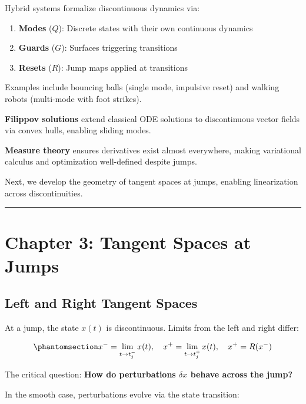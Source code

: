\documentclass[
  letterpaper,
  DIV=11,
  numbers=noendperiod]{scrartcl}
\providecommand{\tightlist}{%
  \setlength{\itemsep}{0pt}\setlength{\parskip}{0pt}}\usepackage{longtable,booktabs,array}
\begin{document}
Hybrid systems formalize discontinuous dynamics via:

\begin{enumerate}
\def\labelenumi{\arabic{enumi}.}
\tightlist
\item
  \textbf{Modes} (\(Q\)): Discrete states with their own continuous
  dynamics
\item
  \textbf{Guards} (\(G\)): Surfaces triggering transitions
\item
  \textbf{Resets} (\(R\)): Jump maps applied at transitions
\end{enumerate}

Examples include bouncing balls (single mode, impulsive reset) and
walking robots (multi-mode with foot strikes).

\textbf{Filippov solutions} extend classical ODE solutions to
discontinuous vector fields via convex hulls, enabling sliding modes.

\textbf{Measure theory} ensures derivatives exist almost everywhere,
making variational calculus and optimization well-defined despite jumps.

Next, we develop the geometry of tangent spaces at jumps, enabling
linearization across discontinuities.

\begin{center}\rule{0.5\linewidth}{0.5pt}\end{center}

\section{Chapter 3: Tangent Spaces at Jumps}\label{sec-tangent-jumps}

\subsection{Left and Right Tangent
Spaces}\label{left-and-right-tangent-spaces}

At a jump, the state \(x(t)\) is discontinuous. Limits from the left and
right differ:

\begin{equation}\phantomsection\label{eq-jump-limits}{
x^- = \lim_{t \to t_j^-} x(t), \quad x^+ = \lim_{t \to t_j^+} x(t), \quad x^+ = R(x^-)
}\end{equation}

The critical question: \textbf{How do perturbations \(\delta x\) behave
across the jump?}

In the smooth case, perturbations evolve via the state transition:
\end{document}
